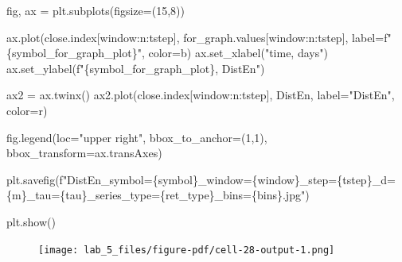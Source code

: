 \documentclass[
  letterpaper,
]{report}
\newenvironment{Shaded}{\begin{snugshade}}{\end{snugshade}}
\newcommand{\DecValTok}[1]{\textcolor[rgb]{0.68,0.00,0.00}{#1}}
\newcommand{\NormalTok}[1]{\textcolor[rgb]{0.00,0.23,0.31}{#1}}
\newcommand{\OperatorTok}[1]{\textcolor[rgb]{0.37,0.37,0.37}{#1}}
\newcommand{\SpecialCharTok}[1]{\textcolor[rgb]{0.37,0.37,0.37}{#1}}
\newcommand{\SpecialStringTok}[1]{\textcolor[rgb]{0.13,0.47,0.30}{#1}}
\newcommand{\StringTok}[1]{\textcolor[rgb]{0.13,0.47,0.30}{#1}}
\begin{document}
\begin{Shaded}
\begin{Highlighting}[]
\NormalTok{fig, ax }\OperatorTok{=}\NormalTok{ plt.subplots(figsize}\OperatorTok{=}\NormalTok{(}\DecValTok{15}\NormalTok{,}\DecValTok{8}\NormalTok{))}

\NormalTok{ax.plot(close.index[window:n:tstep], for\_graph.values[window:n:tstep], label}\OperatorTok{=}\SpecialStringTok{f"}\SpecialCharTok{\{}\NormalTok{symbol\_for\_graph\_plot}\SpecialCharTok{\}}\SpecialStringTok{"}\NormalTok{, color}\OperatorTok{=}\StringTok{\textquotesingle{}b\textquotesingle{}}\NormalTok{)}
\NormalTok{ax.set\_xlabel(}\StringTok{"time, days"}\NormalTok{)}
\NormalTok{ax.set\_ylabel(}\SpecialStringTok{f"}\SpecialCharTok{\{}\NormalTok{symbol\_for\_graph\_plot}\SpecialCharTok{\}}\SpecialStringTok{, DistEn"}\NormalTok{)}

\NormalTok{ax2 }\OperatorTok{=}\NormalTok{ ax.twinx()}
\NormalTok{ax2.plot(close.index[window:n:tstep], DistEn, label}\OperatorTok{=}\StringTok{"DistEn"}\NormalTok{, color}\OperatorTok{=}\StringTok{\textquotesingle{}r\textquotesingle{}}\NormalTok{)}

\NormalTok{fig.legend(loc}\OperatorTok{=}\StringTok{"upper right"}\NormalTok{, bbox\_to\_anchor}\OperatorTok{=}\NormalTok{(}\DecValTok{1}\NormalTok{,}\DecValTok{1}\NormalTok{), bbox\_transform}\OperatorTok{=}\NormalTok{ax.transAxes)}

\NormalTok{plt.savefig(}\SpecialStringTok{f"DistEn\_symbol=}\SpecialCharTok{\{}\NormalTok{symbol}\SpecialCharTok{\}}\SpecialStringTok{\_window=}\SpecialCharTok{\{}\NormalTok{window}\SpecialCharTok{\}}\SpecialStringTok{\_step=}\SpecialCharTok{\{}\NormalTok{tstep}\SpecialCharTok{\}}\SpecialStringTok{\_d=}\SpecialCharTok{\{}\NormalTok{m}\SpecialCharTok{\}}\SpecialStringTok{\_tau=}\SpecialCharTok{\{}\NormalTok{tau}\SpecialCharTok{\}}\SpecialStringTok{\_series\_type=}\SpecialCharTok{\{}\NormalTok{ret\_type}\SpecialCharTok{\}}\SpecialStringTok{\_bins=}\SpecialCharTok{\{}\NormalTok{bins}\SpecialCharTok{\}}\SpecialStringTok{.jpg"}\NormalTok{)}

\NormalTok{plt.show()}
\end{Highlighting}
\end{Shaded}

\begin{figure}[H]

{\centering \texttt{[image: lab\_5\_files/figure-pdf/cell-28-output-1.png]}

}

\end{figure}
\end{document}
